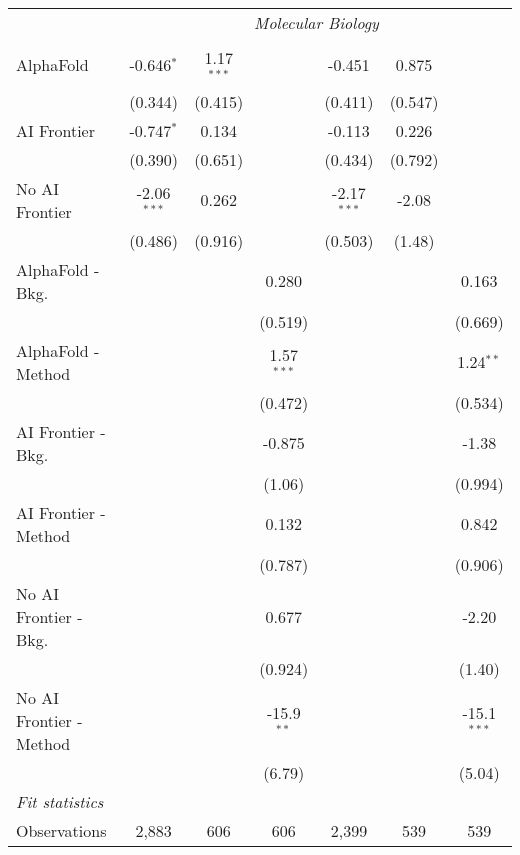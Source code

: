 \begin{tabular}{lcccccc}
 & \multicolumn{6}{c}{\textit{Molecular Biology}} \\ \\
   AlphaFold               & -0.646$^{*}$  & 1.17$^{***}$ &              & -0.451        & 0.875   &   \\   
                           & (0.344)       & (0.415)      &              & (0.411)       & (0.547) &   \\   
   AI Frontier             & -0.747$^{*}$  & 0.134        &              & -0.113        & 0.226   &   \\   
                           & (0.390)       & (0.651)      &              & (0.434)       & (0.792) &   \\   
   No AI Frontier          & -2.06$^{***}$ & 0.262        &              & -2.17$^{***}$ & -2.08   &   \\   
                           & (0.486)       & (0.916)      &              & (0.503)       & (1.48)  &   \\   
   AlphaFold - Bkg.        &               &              & 0.280        &               &         & 0.163\\   
                           &               &              & (0.519)      &               &         & (0.669)\\   
   AlphaFold - Method      &               &              & 1.57$^{***}$ &               &         & 1.24$^{**}$\\   
                           &               &              & (0.472)      &               &         & (0.534)\\   
   AI Frontier - Bkg.      &               &              & -0.875       &               &         & -1.38\\   
                           &               &              & (1.06)       &               &         & (0.994)\\   
   AI Frontier - Method    &               &              & 0.132        &               &         & 0.842\\   
                           &               &              & (0.787)      &               &         & (0.906)\\   
   No AI Frontier - Bkg.   &               &              & 0.677        &               &         & -2.20\\   
                           &               &              & (0.924)      &               &         & (1.40)\\   
   No AI Frontier - Method &               &              & -15.9$^{**}$ &               &         & -15.1$^{***}$\\   
                           &               &              & (6.79)       &               &         & (5.04)\\   
   \midrule
   \emph{Fit statistics}\\
   Observations            & 2,883         & 606          & 606          & 2,399         & 539     & 539\\  
   

\end{tabular}
